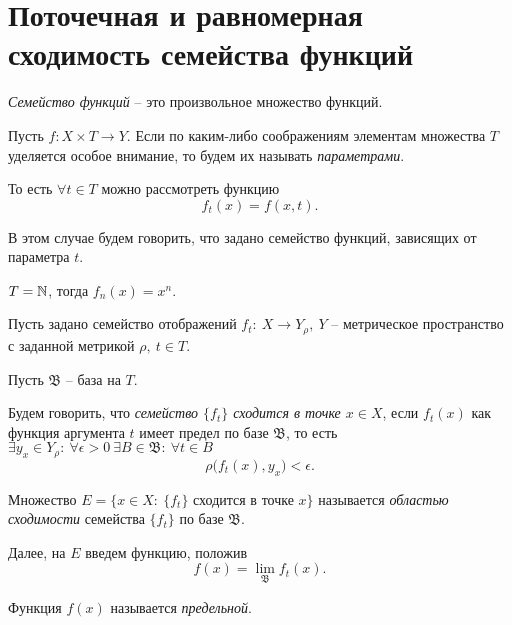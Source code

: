 

\section{Поточечная и равномерная сходимость семейства функций}

\begin{definition}
    \emph{Семейство функций} -- это произвольное множество функций.

    Пусть $f:X\times T \rightarrow Y$. Если по каким-либо соображениям элементам множества $T$ уделяется особое внимание, то будем их называть \emph{параметрами}.

    То есть $\forall t \in T$ можно рассмотреть функцию
    \[
        f_t(x) = f(x,t).
    \]

    В этом случае будем говорить, что задано семейство функций, зависящих от параметра $t$.
\end{definition}

\begin{example}
    $T = \mathbb{N}$, тогда $f_n(x) = x^n$.
\end{example}

\begin{note}
    Пусть задано семейство отображений $f_t: \ X\rightarrow Y_\rho, \ Y$ -- метрическое пространство с заданной метрикой $\rho, \ t \in T$.

    Пусть $\mathfrak{B}$ -- база на $T$.
\end{note}

\begin{definition}
    Будем говорить, что \emph{семейство $\{f_t\}$ сходится в точке $x \in X$}, если $f_t(x)$ как функция аргумента $t$ имеет предел по базе $\mathfrak{B}$, то есть $\exists y_x \in Y_\rho: \ \forall \epsilon > 0 \ \exists B \in \mathfrak{B}: \ \forall t \in B$
    \[
        \rho\big(f_t(x),y_x\big) < \epsilon.
    \]
\end{definition}

\begin{definition}
    Множество $E = \big\{x \in X : \ \{f_t\}$ сходится в точке $x\big\}$ называется \emph{областью сходимости} семейства $\{f_t\}$ по базе $\mathfrak{B}$.

    Далее, на $E$ введем функцию, положив
    \[
        f(x) = \underset{\mathfrak{B}}{\lim}f_t(x).
    \]

    Функция $f(x)$ называется \emph{предельной}.
\end{definition}


